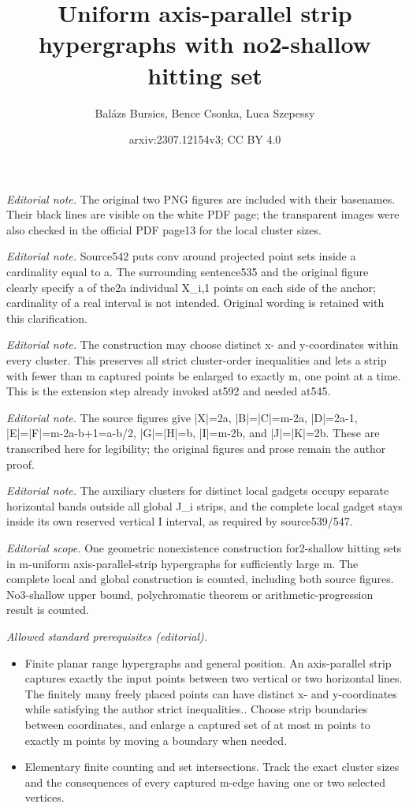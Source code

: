 \documentclass[10pt,a4paper]{amsart}
\title{Uniform axis-parallel strip hypergraphs with no2-shallow hitting set}
\author{Balázs Bursics, Bence Csonka, Luca Szepessy}
\date{arxiv:2307.12154v3; CC BY 4.0}
\begin{document}
\maketitle
\noindent\textit{Editorial note.} The original two PNG figures are included with their basenames. Their black lines are visible on the white PDF page; the transparent images were also checked in the official PDF page13 for the local cluster sizes.\par\medskip
\noindent\textit{Editorial note.} Source542 puts conv around projected point sets inside a cardinality equal to a. The surrounding sentence535 and the original figure clearly specify a of the2a individual X\_i,1 points on each side of the anchor; cardinality of a real interval is not intended. Original wording is retained with this clarification.\par\medskip
\noindent\textit{Editorial note.} The construction may choose distinct x- and y-coordinates within every cluster. This preserves all strict cluster-order inequalities and lets a strip with fewer than m captured points be enlarged to exactly m, one point at a time. This is the extension step already invoked at592 and needed at545.\par\medskip
\noindent\textit{Editorial note.} The source figures give |X|=2a, |B|=|C|=m-2a, |D|=2a-1, |E|=|F|=m-2a-b+1=a-b/2, |G|=|H|=b, |I|=m-2b, and |J|=|K|=2b. These are transcribed here for legibility; the original figures and prose remain the author proof.\par\medskip
\noindent\textit{Editorial note.} The auxiliary clusters for distinct local gadgets occupy separate horizontal bands outside all global J\_i strips, and the complete local gadget stays inside its own reserved vertical I interval, as required by source539/547.\par\medskip
\noindent\textit{Editorial scope.} One geometric nonexistence construction for2-shallow hitting sets in m-uniform axis-parallel-strip hypergraphs for sufficiently large m. The complete local and global construction is counted, including both source figures. No3-shallow upper bound, polychromatic theorem or arithmetic-progression result is counted.\par\medskip
\noindent\textit{Allowed standard prerequisites (editorial).}\begin{itemize}
\item Finite planar range hypergraphs and general position. An axis-parallel strip captures exactly the input points between two vertical or two horizontal lines. The finitely many freely placed points can have distinct x- and y-coordinates while satisfying the author strict inequalities.. Choose strip boundaries between coordinates, and enlarge a captured set of at most m points to exactly m points by moving a boundary when needed.
\item Elementary finite counting and set intersections. Track the exact cluster sizes and the consequences of every captured m-edge having one or two selected vertices.
\end{itemize}\medskip
\end{document}
